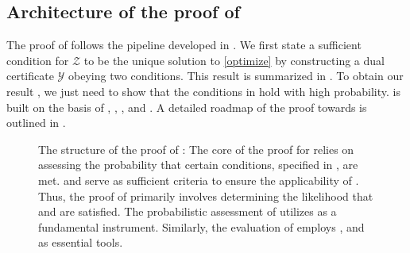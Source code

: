 \documentclass[twoside,12pt]{article}
\begin{document}
\subsection{Architecture of the  proof of }\label{proof}
 The proof of  follows the pipeline developed in \citep{Lu18,
 zhang2017exact}. We first  state a sufficient condition for $\mathcal{Z}$ to be the unique solution to \eqref{optimize} by constructing a dual certificate $\mathcal{Y}$ obeying two conditions. This result is summarized in . To obtain our  result , we just need to show that the conditions in  hold with high probability.  is built on the basis of , , , and . A detailed roadmap of the proof towards  is outlined in . 
\begin{figure}[!th]
\centering
{}
\caption{\footnotesize The structure of the proof of :  
The core of the proof for   relies on assessing the probability that certain conditions, specified in , are met.  and  serve as sufficient criteria to ensure the applicability of . Thus, the proof of  primarily involves determining the likelihood that  and  are satisfied. The probabilistic assessment of  utilizes   as a fundamental instrument. Similarly, the evaluation of  employs , and  as essential tools.}\label{architecture}
\vspace{-5mm}
\end{figure}
\end{document}

